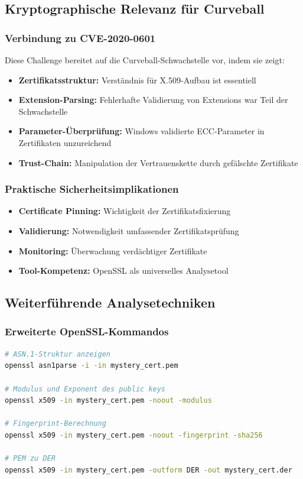 \documentclass{article}
\begin{document}
\subsection{Kryptographische Relevanz für Curveball}

\subsubsection{Verbindung zu CVE-2020-0601}
Diese Challenge bereitet auf die Curveball-Schwachstelle vor, indem sie zeigt:

\begin{itemize}
    \item \textbf{Zertifikatsstruktur:} Verständnis für X.509-Aufbau ist essentiell
    \item \textbf{Extension-Parsing:} Fehlerhafte Validierung von Extensions war Teil der Schwachstelle
    \item \textbf{Parameter-Überprüfung:} Windows validierte ECC-Parameter in Zertifikaten unzureichend
    \item \textbf{Trust-Chain:} Manipulation der Vertrauenskette durch gefälschte Zertifikate
\end{itemize}

\subsubsection{Praktische Sicherheitsimplikationen}
\begin{itemize}
    \item \textbf{Certificate Pinning:} Wichtigkeit der Zertifikatsfixierung
    \item \textbf{Validierung:} Notwendigkeit umfassender Zertifikatsprüfung
    \item \textbf{Monitoring:} Überwachung verdächtiger Zertifikate
    \item \textbf{Tool-Kompetenz:} OpenSSL als universelles Analysetool
\end{itemize}

\subsection{Weiterführende Analysetechniken}

\subsubsection{Erweiterte OpenSSL-Kommandos}
\begin{lstlisting}[language=bash,caption={Erweiterte Zertifikatsanalyse}]
# ASN.1-Struktur anzeigen
openssl asn1parse -i -in mystery_cert.pem

# Modulus und Exponent des public keys
openssl x509 -in mystery_cert.pem -noout -modulus

# Fingerprint-Berechnung
openssl x509 -in mystery_cert.pem -noout -fingerprint -sha256

# PEM zu DER
openssl x509 -in mystery_cert.pem -outform DER -out mystery_cert.der
\end{lstlisting}
\end{document}
